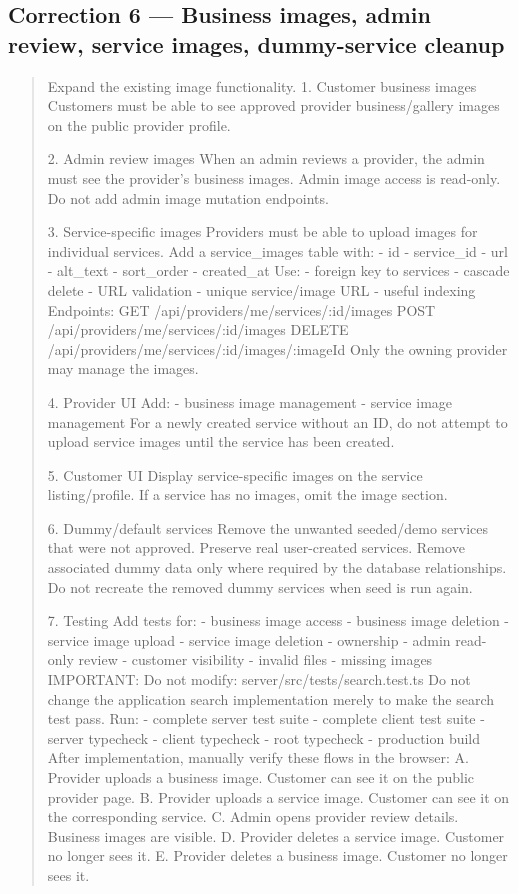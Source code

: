 \subsection*{Correction 6 --- Business images, admin review, service images, dummy-service cleanup}

\begin{quote}
Expand the existing image functionality.
1. Customer business images
Customers must be able to see approved provider business/gallery images
on the public provider profile.

2. Admin review images
When an admin reviews a provider, the admin must see the provider's
business images.
Admin image access is read-only.
Do not add admin image mutation endpoints.

3. Service-specific images
Providers must be able to upload images for individual services.
Add a service_images table with:
- id
- service_id
- url
- alt_text
- sort_order
- created_at
Use:
- foreign key to services
- cascade delete
- URL validation
- unique service/image URL
- useful indexing
Endpoints:
GET /api/providers/me/services/:id/images
POST /api/providers/me/services/:id/images
DELETE /api/providers/me/services/:id/images/:imageId
Only the owning provider may manage the images.

4. Provider UI
Add:
- business image management
- service image management
For a newly created service without an ID, do not attempt to upload
service images until the service has been created.

5. Customer UI
Display service-specific images on the service listing/profile.
If a service has no images, omit the image section.

6. Dummy/default services
Remove the unwanted seeded/demo services that were not approved.
Preserve real user-created services.
Remove associated dummy data only where required by the database
relationships.
Do not recreate the removed dummy services when seed is run again.

7. Testing
Add tests for:
- business image access
- business image deletion
- service image upload
- service image deletion
- ownership
- admin read-only review
- customer visibility
- invalid files
- missing images
IMPORTANT:
Do not modify:
server/src/tests/search.test.ts
Do not change the application search implementation merely to make the
search test pass.
Run:
- complete server test suite
- complete client test suite
- server typecheck
- client typecheck
- root typecheck
- production build
After implementation, manually verify these flows in the browser:
A. Provider uploads a business image.
 Customer can see it on the public provider page.
B. Provider uploads a service image.
 Customer can see it on the corresponding service.
C. Admin opens provider review details.
 Business images are visible.
D. Provider deletes a service image.
 Customer no longer sees it.
E. Provider deletes a business image.
 Customer no longer sees it.
\end{quote}

